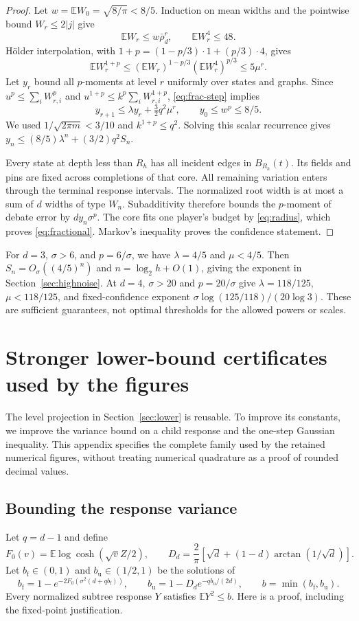 \documentclass[11pt]{article}
\theoremstyle{definition}
\theoremstyle{remark}
\newcommand{\E}{\mathbb E}
\begin{document}
\begin{proof}
Let $w=\E W_0=\sqrt{8/\pi}<8/5$. Induction on mean widths and the
pointwise bound $W_r\le2|j|$ give
\[
 \E W_r\le w\bar\rho_d^r,\qquad \E W_r^4\le48.
\]
H\"older interpolation, with $1+p=(1-p/3)\cdot1+(p/3)\cdot4$, gives
\[
 \E W_r^{1+p}\le(\E W_r)^{1-p/3}(\E W_r^4)^{p/3}
                   \le5\mu^r.
\]
Let $y_r$ bound all $p$-moments at level $r$ uniformly over states and
graphs. Since $u^p\le\sum_iW_{r,i}^p$ and
$u^{1+p}\le k^p\sum_iW_{r,i}^{1+p}$, \eqref{eq:frac-step} implies
\[
 y_{r+1}\le\lambda y_r+\tfrac32q^2\mu^r,
 \qquad y_0\le w^p\le8/5.
\]
We used $1/\sqrt{2\pi m}<3/10$ and $k^{1+p}\le q^2$.
Solving this scalar recurrence gives
$y_n\le(8/5)\lambda^n+(3/2)q^2S_n$.

Every state at depth less than $R_h$ has all incident edges in $B_{R_h}(t)$.
Its fields and pins are fixed across completions of that core. All remaining
variation enters through the terminal response intervals. The normalized
root width is at most a sum of $d$ widths of type $W_n$. Subadditivity
therefore bounds the $p$-moment of debate error by $d y_n\sigma^p$.
The core fits one player's budget by \eqref{eq:radius}, which proves
\eqref{eq:fractional}. Markov's inequality proves the confidence statement.
\end{proof}

For $d=3$, $\sigma>6$, and $p=6/\sigma$, we have $\lambda=4/5$ and
$\mu<4/5$. Then $S_n=O_\sigma((4/5)^n)$ and
$n=\log_2 h+O(1)$, giving the exponent in Section~\ref{sec:highnoise}.
At $d=4$, $\sigma>20$ and $p=20/\sigma$ give $\lambda=118/125$,
$\mu<118/125$, and fixed-confidence exponent
$\sigma\log(125/118)/(20\log3)$. These are sufficient guarantees, not
optimal thresholds for the allowed powers or scales.

\clearpage
\section{Stronger lower-bound certificates used by the figures}
\label{app:stronger}

The level projection in Section~\ref{sec:lower} is reusable. To improve
its constants, we improve the variance bound on a child response and the
one-step Gaussian inequality. This appendix specifies the complete family
used by the retained numerical figures, without treating numerical
quadrature as a proof of rounded decimal values.

\subsection{Bounding the response variance}
\label{app:variance}
Let $q=d-1$ and define
\[
 F_0(v)=\E\log\cosh(\sqrt v Z/2),\qquad
 D_d=\frac2\pi[\sqrt d+(1-d)\arctan(1/\sqrt d)].
\]
Let $b_{\mathrm f}\in(0,1)$ and $b_{\mathrm u}\in(1/2,1)$ be the solutions
of
\begin{equation}
 b_{\mathrm f}=1-e^{-2F_0(\sigma^2(d+qb_{\mathrm f}))},\qquad
 b_{\mathrm u}=1-D_d e^{-q b_{\mathrm u}/(2d)},\qquad
 b=\min(b_{\mathrm f},b_{\mathrm u}).
 \label{eq:variance}
\end{equation}
Every normalized subtree response $Y$ satisfies $\E Y^2\le b$.
Here is a proof, including the fixed-point justification.
\end{document}
